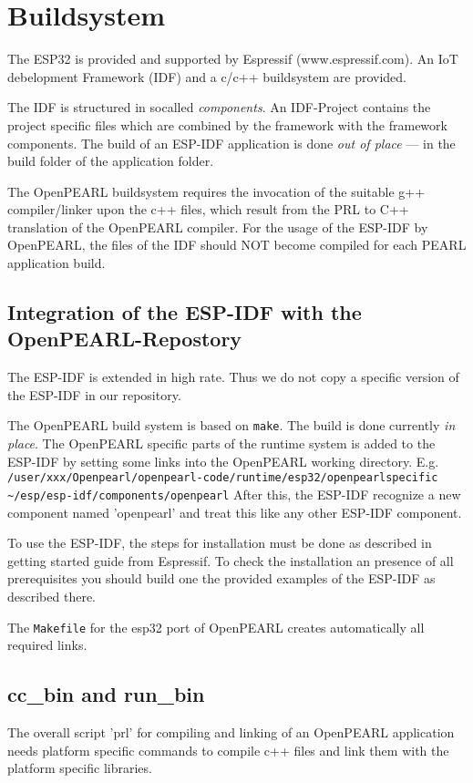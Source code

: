 \section{Buildsystem}

The ESP32 is provided and supported by Espressif (www.espressif.com).
An IoT debelopment Framework (IDF) and a c/c++ buildsystem are provided. 

The IDF is structured in socalled {\em components}. An IDF-Project contains
the project specific files which are combined by the framework with the 
framework components. The build of an ESP-IDF application is done 
{\em out of place} --- in the build folder of the application folder.

The OpenPEARL buildsystem requires the invocation of the suitable 
g++ compiler/linker upon the c++ files, which result from the PRL to C++ 
translation of the OpenPEARL compiler.
For the usage of the ESP-IDF by OpenPEARL, the files of the IDF should NOT 
become compiled for each PEARL application build.

\subsection{Integration of the ESP-IDF with the OpenPEARL-Repostory}
The ESP-IDF is extended in high rate. Thus we do not copy a specific
version of the ESP-IDF in our repository.

The OpenPEARL build system is based on \verb|make|. The build is done 
currently {\em in place}.
The OpenPEARL specific parts of the runtime system is added to the ESP-IDF
by setting some links into the OpenPEARL working directory.
E.g. \verb|/user/xxx/Openpearl/openpearl-code/runtime/esp32/openpearlspecific ~/esp/esp-idf/components/openpearl|
After this, the ESP-IDF recognize a new component named 'openpearl' and
 treat this like any other ESP-IDF component.

To use the ESP-IDF, the steps for installation must be done as described in 
getting started guide from Espressif.
To check the installation an presence of all prerequisites you should build
 one the provided examples of the ESP-IDF as described there.

The \verb|Makefile|  for the esp32 port of OpenPEARL creates automatically all
required links.

\subsection{cc\_bin and run\_bin}
The overall script 'prl' for compiling and linking of an OpenPEARL application
needs platform specific commands to compile c++ files and link them with the 
platform specific libraries.

